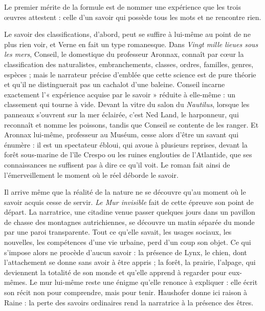 \documentclass[11pt,a4paper]{article}
\begin{document}
Le premier mérite de la formule est de nommer une expérience que les trois œuvres attestent : celle d'un savoir qui possède tous les mots et ne rencontre rien.

Le savoir des classifications, d'abord, peut se suffire à lui-même au point de ne plus rien voir, et Verne en fait un type romanesque. Dans \emph{Vingt mille lieues sous les mers}, Conseil, le domestique du professeur Aronnax, connaît par cœur la classification des naturalistes, embranchements, classes, ordres, familles, genres, espèces ; mais le narrateur précise d'emblée que cette science est de pure théorie et qu'il ne distinguerait pas un cachalot d'une baleine. Conseil incarne exactement l'« expérience acquise par le savoir » réduite à elle-même : un classement qui tourne à vide. Devant la vitre du salon du \emph{Nautilus}, lorsque les panneaux s'ouvrent sur la mer éclairée, c'est Ned Land, le harponneur, qui reconnaît et nomme les poissons, tandis que Conseil se contente de les ranger. Et Aronnax lui-même, professeur au Muséum, cesse alors d'être un savant qui énumère : il est un spectateur ébloui, qui avoue à plusieurs reprises, devant la forêt sous-marine de l'île Crespo ou les ruines englouties de l'Atlantide, que ses connaissances ne suffisent pas à dire ce qu'il voit. Le roman fait ainsi de l'émerveillement le moment où le réel déborde le savoir.

Il arrive même que la réalité de la nature ne se découvre qu'au moment où le savoir acquis cesse de servir. \emph{Le Mur invisible} fait de cette épreuve son point de départ. La narratrice, une citadine venue passer quelques jours dans un pavillon de chasse des montagnes autrichiennes, se découvre un matin séparée du monde par une paroi transparente. Tout ce qu'elle savait, les usages sociaux, les nouvelles, les compétences d'une vie urbaine, perd d'un coup son objet. Ce qui s'impose alors ne procède d'aucun savoir : la présence de Lynx, le chien, dont l'attachement se donne sans avoir à être appris ; la forêt, la prairie, l'alpage, qui deviennent la totalité de son monde et qu'elle apprend à regarder pour eux-mêmes. Le mur lui-même reste une énigme qu'elle renonce à expliquer : elle écrit son récit non pour comprendre, mais pour tenir. Haushofer donne ici raison à Raine : la perte des savoirs ordinaires rend la narratrice à la présence des êtres.
\end{document}
